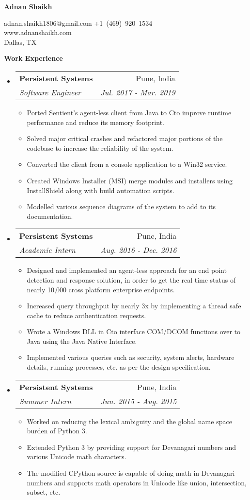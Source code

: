 \documentclass[letterpaper,12pt]{article}
\makeatletter
\def\CC{{C\nolinebreak[4]\hspace{-.05em}\raisebox{.4ex}{\tiny\bf ++ }}}
\newcommand{\resitem}[1]{\item #1 \vspace{-2pt}}
\newcommand{\resheading}[1]{{\large \colorbox{mygrey}{\begin{minipage}{\textwidth}{\textbf{#1 \vphantom{p\^{E}}}}\end{minipage}}}}
\newcommand{\ressubheading}[4]{
    \begin{tabular*}{7.0in}{l@{\extracolsep{\fill}}r}
      \textbf{#1} & #2 \\
      \textit{#3} & \textit{#4} \\
    \end{tabular*}\vspace{-6pt}}
\makeatother
\begin{document}
  
  \begin{center}
    \textbf{\Large Adnan Shaikh}
  \end{center}
  
  \begin{center}
    adnan.shaikh1806@gmail.com \vert +1~(469)~920~1534\\
    www.adnanshaikh.com\\
    Dallas, TX \\
  \end{center}
  
  \vspace{0.1in}
  
  \resheading{Work Experience}
  \begin{itemize}
  \item
    \ressubheading{Persistent Systems}{Pune, India}{Software Engineer}{Jul. 2017 - Mar. 2019}
    \begin{itemize}
      \resitem{Ported Sentient's agent-less client from Java to \CC to improve runtime performance and reduce its memory footprint.}
      \resitem{Solved major critical crashes and refactored major portions of the codebase to increase the reliability of the system.}
      \resitem{Converted the client from a console application to a Win32 service.}
      \resitem{Created Windows Installer (MSI) merge modules and installers using InstallShield along with build automation scripts.}
      \resitem{Modelled various sequence diagrams of the system to add to its documentation.}
    \end{itemize}
  \item
    \ressubheading{Persistent Systems}{Pune, India}{Academic Intern}{Aug. 2016 - Dec. 2016}
    \begin{itemize}
      \resitem{Designed and implemented an agent-less approach for an end point detection and response solution, in order to get the real time status of nearly 10,000 cross platform enterprise endpoints.}
      \resitem{Increased query throughput by nearly 3x by implementing a thread safe cache to reduce authentication requests.}
      \resitem{Wrote a Windows DLL in \CC to interface COM/DCOM functions over to Java using the Java Native Interface.}
      \resitem{Implemented various queries such as security, system alerts, hardware details, running processes, etc. as per the design specification.}
    \end{itemize}
  \item
    \ressubheading{Persistent Systems}{Pune, India}{Summer Intern}{Jun. 2015 - Aug. 2015}
    \begin{itemize}
      \resitem{Worked on reducing the lexical ambiguity and the global name space burden of Python 3.}
      \resitem{Extended Python 3 by providing support for Devanagari numbers and various Unicode math characters.}
      \resitem{The modified CPython source is capable of doing math in Devanagari numbers and supports math operators in Unicode like union, intersection, subset, etc.}
    \end{itemize}
  \end{itemize}
  
\end{document}

